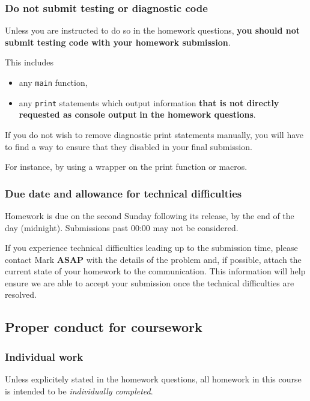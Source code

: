 \documentclass[11pt]{article}
\begin{document}
\subsubsection*{Do not submit testing or diagnostic code}
\label{sec:org865db25}

Unless you are instructed to do so in the homework questions,
\textbf{you should not submit testing code with your homework submission}.

This includes
\begin{itemize}
\item any \texttt{main} function,
\item any \texttt{print} statements which output information
\textbf{that is not directly requested as console output}
\textbf{in the homework questions}.
\end{itemize}

If you do not wish to remove diagnostic print statements manually,
you will have to find a way to ensure that they disabled
in your final submission.

For instance, by using a wrapper on the print function or macros.

\subsubsection*{Due date and allowance for technical difficulties}
\label{sec:orgcaf9ce8}

Homework is due on the second Sunday following its release,
by the end of the day (midnight).
Submissions past 00:00 may not be considered.

If you experience technical difficulties
leading up to the submission time,
please contact Mark \textbf{ASAP} with the details of the problem
and, if possible, attach the current state of your homework
to the communication.
This information will help ensure we are able
to accept your submission once the technical difficulties are resolved.

\subsection*{Proper conduct for coursework}
\label{sec:org2a531f4}
\subsubsection*{Individual work}
\label{sec:org9729a00}

Unless explicitely stated in the homework questions,
all homework in this course is intended
to be \emph{individually completed}.
\end{document}
